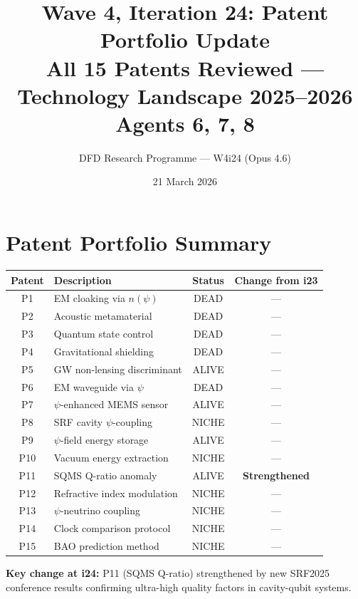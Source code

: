 \documentclass[11pt]{article}
\title{\textbf{Wave 4, Iteration 24: Patent Portfolio Update}\\[12pt]
{\large All 15 Patents Reviewed --- Technology Landscape 2025--2026}\\[4pt]
{\large Agents 6, 7, 8}}
\author{DFD Research Programme --- W4i24 (Opus 4.6)}
\date{21 March 2026}
\begin{document}
\maketitle
\tableofcontents
\newpage

\section*{Patent Portfolio Summary}

\begin{tcolorbox}[colback=blue!5!white, colframe=blue!70!black,
  title=\textbf{W4i24 PATENT STATUS OVERVIEW}]

\begin{center}
\begin{tabular}{clcc}
\toprule
\textbf{Patent} & \textbf{Description} & \textbf{Status} & \textbf{Change from i23} \\
\midrule
P1 & EM cloaking via $n(\psi)$ & DEAD & --- \\
P2 & Acoustic metamaterial & DEAD & --- \\
P3 & Quantum state control & DEAD & --- \\
P4 & Gravitational shielding & DEAD & --- \\
P5 & GW non-lensing discriminant & ALIVE & --- \\
P6 & EM waveguide via $\psi$ & DEAD & --- \\
P7 & $\psi$-enhanced MEMS sensor & ALIVE & --- \\
P8 & SRF cavity $\psi$-coupling & NICHE & --- \\
P9 & $\psi$-field energy storage & ALIVE & --- \\
P10 & Vacuum energy extraction & NICHE & --- \\
P11 & SQMS Q-ratio anomaly & ALIVE & \textbf{Strengthened} \\
P12 & Refractive index modulation & NICHE & --- \\
P13 & $\psi$-neutrino coupling & NICHE & --- \\
P14 & Clock comparison protocol & NICHE & --- \\
P15 & BAO prediction method & NICHE & --- \\
\bottomrule
\end{tabular}
\end{center}

\textbf{Key change at i24:} P11 (SQMS Q-ratio) strengthened by new SRF2025
conference results confirming ultra-high quality factors in cavity-qubit
systems.

\end{tcolorbox}
\end{document}
